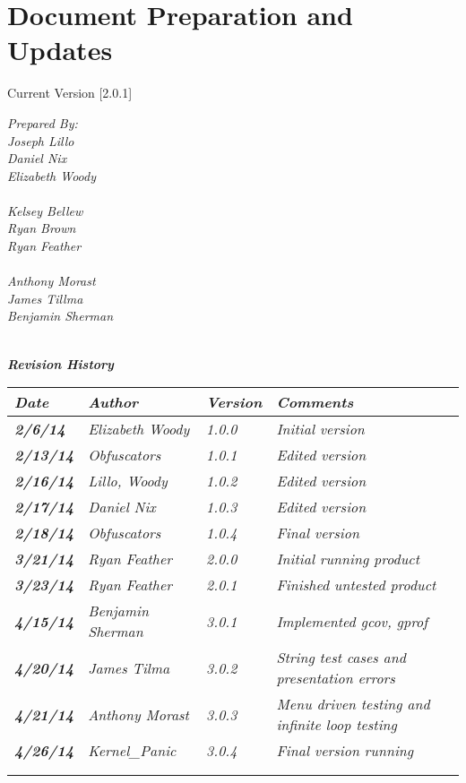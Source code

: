 
\chapter{Document Preparation and Updates}

Current Version [2.0.1]
\vspace*{5mm}

{\color{MSBlue3}
\noindent
\textit{Prepared By:}\\
\textit{Joseph Lillo}\\
\textit{Daniel Nix}\\
\textit{Elizabeth Woody}\\ 
\\
\textit{Kelsey Bellew}\\
\textit{Ryan Brown}\\
\textit{Ryan Feather}\\
\\
\textit{Anthony Morast}\\
\textit{James Tillma}\\
\textit{Benjamin Sherman}\\
\\
}

\vfill
\noindent
{\color{color02} \textit{\textbf{Revision History}}}\\
\begin{tabular}{|>{\raggedright}p{1.5cm}|>{\raggedright}p{3cm}|>{\raggedright}p{1.5cm}|>{\raggedright}p{9cm}|}
\hline
\textit{\textbf{Date}} &  \textit{\textbf{Author}} & \textit{\textbf{Version}} & \textit{\textbf{Comments}}\tabularnewline
\hline
 \textit{\textbf{2/6/14}} & \textit{Elizabeth Woody} & \textit{1.0.0} & \textit{Initial version}\tabularnewline
\hline
\textit{\textbf{2/13/14}} & \textit{Obfuscators} & \textit{1.0.1} & \textit{Edited version}\tabularnewline
\hline
 \textit{\textbf{2/16/14}} & \textit{Lillo, Woody} & \textit{1.0.2} & \textit{Edited version}\tabularnewline
 \hline
 \textit{\textbf{2/17/14}} & \textit{Daniel Nix} & \textit{1.0.3} & \textit{Edited version}\tabularnewline
\hline
 \textit{\textbf{2/18/14}} & \textit{Obfuscators} & \textit{1.0.4} & \textit{Final version}\tabularnewline
 \hline
 \textit{\textbf{3/21/14}} & \textit{Ryan Feather} & \textit{2.0.0} & \textit{Initial running product}\tabularnewline
\hline
 \textit{\textbf{3/23/14}} & \textit{Ryan Feather} & \textit{2.0.1} & \textit{Finished untested product}\tabularnewline
\hline
 \textit{\textbf{4/15/14}} & \textit{Benjamin Sherman} & \textit{3.0.1} & \textit{Implemented gcov, gprof}\tabularnewline
\hline
 \textit{\textbf{4/20/14}} & \textit{James Tilma} & \textit{3.0.2} & \textit{String test cases and presentation errors}\tabularnewline
\hline 
 \textit{\textbf{4/21/14}} & \textit{Anthony Morast} & \textit{3.0.3} & \textit{Menu driven testing and infinite loop testing}\tabularnewline
\hline
 \textit{\textbf{4/26/14}} & \textit{Kernel\_Panic} & \textit{3.0.4} & \textit{Final version running}\tabularnewline
\hline

\hline
 &  &  & \tabularnewline
\hline
 &  &  & \tabularnewline
\hline
\end{tabular}
\vfill

